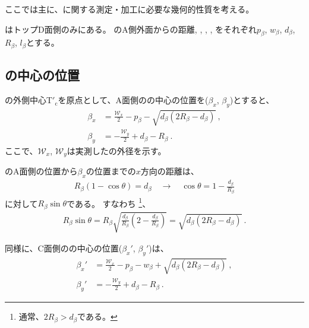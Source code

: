 

ここでは主に、\textbf{\EndFaceBoring}に関する測定・加工に必要な幾何的性質を考える。



\EndFaceBoring はトップD面側のみにある。
\EndFaceBoring のA側外面からの距離, \EndFaceBoringWidth, \EndFaceBoringDepth, \EndFaceBoringCornerR, \EndFaceBoringLength をそれぞれ$p_\beta$, $w_\beta$, $d_\beta$, $R_\beta$, $l_\beta$とする。


\subsection{\EndFaceBoringCornerR の中心の位置}
\TopEndFace の外側中心T$'_\mathrm c$を原点として、A面側の\EndFaceBoringCornerR の中心の位置を($\beta_x$, $\beta_y$)とすると、
\begin{align*}
  \beta_x &= \frac{\mathcal W_x}2-p_\beta-\sqrt{d_\beta(2R_\beta-d_\beta)}\ ,\\
  \beta_y &= -\frac{\mathcal W_y}2+d_\beta-R_\beta\ .
\end{align*}
ここで、$\mathcal W_x$, $\mathcal W_y$は実測した\TopEndFace の外径を示す。
\begin{hosoku}
\EndFaceBoring のA面側の位置から$\beta_x$の位置までの$x$方向の距離は、
\begin{align*}
  R_\beta(1-\cos\theta) = d_\beta\quad
  \longrightarrow\quad
  \cos\theta = 1-\frac{d_\beta}{R_\beta}
\end{align*}
に対して$R_\beta\sin\theta$である。
すなわち
\footnote{通常、$2R_\beta > d_\beta$である。}、
\begin{align*}
  R_\beta\sin\theta
  = R_\beta\sqrt{\frac{d_\beta}{R_\beta}\left(2-\frac{d_\beta}{R_\beta}\right)}
  = \sqrt{d_\beta(2R_\beta-d_\beta)}\ .
\end{align*}
\end{hosoku}
同様に、C面側の\EndFaceBoringCornerR の中心の位置($\beta_x'$, $\beta_y'$)は、
\begin{align*}
  \beta_x' &= \frac{\mathcal W_x}2-p_\beta-w_\beta+\sqrt{d_\beta(2R_\beta-d_\beta)}\ ,\\
  \beta_y' &= -\frac{\mathcal W_y}2+d_\beta-R_\beta\ .
\end{align*}


